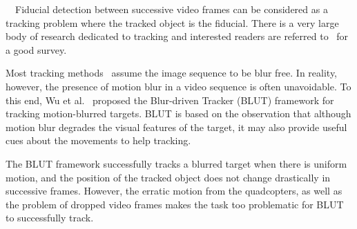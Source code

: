 
~~Fiducial detection between successive video
frames can be considered as a tracking problem where the tracked
object is the fiducial.  There is a very large body of research
dedicated to tracking and interested readers are referred
to~\cite{Yilmaz:2006} for a good survey.

Most tracking methods~\cite{Ross:2008,Wu:2009,Perez02,Mei:2009} assume
the image sequence to be blur free. In reality, however, the presence
of motion blur in a video sequence is often unavoidable. To this end,
Wu et al.~\cite{Wu:2011} proposed the Blur-driven Tracker (BLUT)
framework for tracking motion-blurred targets. BLUT is based on the
observation that although motion blur degrades the visual features of
the target, it may also provide useful cues about the movements to
help tracking.

The BLUT framework successfully tracks a blurred target when there is
uniform motion, and the position of the tracked object does not change
drastically in successive frames. However, the erratic motion from the
quadcopters, as well as the problem of dropped video frames makes the task too
problematic for BLUT to successfully track.
